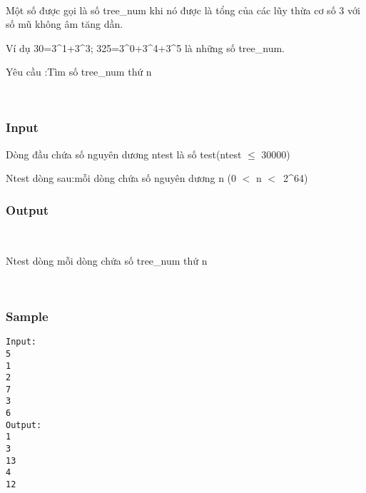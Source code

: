 

 

Một số được gọi là số tree\_num khi nó được là tổng của các lũy thừa cơ số 3 với số mũ không âm tăng dần.

Ví dụ 30=3\textasciicircum1+3\textasciicircum3; 325=3\textasciicircum0+3\textasciicircum4+3\textasciicircum5 là những số tree\_num.

Yêu cầu :Tìm số tree\_num thứ n

 

\subsubsection{Input}

Dòng đầu chứa số nguyên dương ntest là số test(ntest $\le$ 30000)

Ntest dòng sau:mỗi dòng chứa số nguyên dương n (0 $<$ n $<$ 2\textasciicircum64)

\subsubsection{Output}

 

Ntest dòng mỗi dòng chứa số tree\_num thứ n

 

\subsubsection{Sample}
\begin{verbatim}
Input:
5
1
2
7
3
6
Output:
1
3
13
4
12
\end{verbatim}
